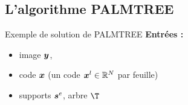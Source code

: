\subsection{L'algorithme PALMTREE}
\begin{frame}{Exemple de solution de PALMTREE}
\textbf{Entrées :} \begin{itemize}
	\item image $\bm{y}$,
	\item code $\bm{x}$ (un code $\bm{x}^l \in \mathbb{R}^N$ par feuille)
	\item supports $\bm{s}^e$, arbre $\T$
\end{itemize}
\begin{figure}\centering
{}
\end{figure}
\end{frame}


